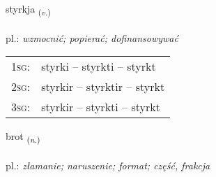 \documentclass[frontgrid, backgrid]{flacards}\usepackage[]{graphicx}\usepackage[]{xcolor}
\begin{document}
\renewcommand{\blhead}{\vskip5pt {\small\bfseries\footnotesize Sagnorð | czasownik }}
\renewcommand{\bcfoot}{\vskip5pt \hspace{2pt}{\small\bfseries\footnotesize 1K}}


{styrkja \small{\textsubscript{(\textit{v.})}} \\[1ex] %
\textphonetic{[stɪr̥ca]} \\
pl.: \emph{wzmocnić; popierać; dofinansowywać} \\  [2ex]
\renewcommand*{\arraystretch}{0.8}
\begin{tabular}{p{1cm}l}
\textsc{1sg}: & styrki -- styrkti -- styrkt \\ 
\textsc{2sg}: & styrkir -- styrktir -- styrkt \\ 
\textsc{3sg}: & styrkir -- styrkti -- styrkt \\ 
\end{tabular}
}

\renewcommand{\flhead}{\vskip5pt \fboxsep=0pt {\small\bfseries\footnotesize Nafnorð | rzeczownik}}
\renewcommand{\fcfoot}{\vskip5pt \fboxsep=0pt \hspace{2pt}{\small\bfseries\footnotesize 1K}}

\renewcommand{\blhead}{\vskip5pt {\small\bfseries\footnotesize Nafnorð | rzeczownik }}
\renewcommand{\bcfoot}{\vskip5pt \hspace{2pt}{\small\bfseries\footnotesize 1K}}


{brot \small{\textsubscript{(\textit{n.})}} \\[1ex] %
\textphonetic{[prɔːt]} \\
pl.: \emph{złamanie; naruszenie; format; część, frakcja} \\  [2ex]
\renewcommand*{\arraystretch}{0.8}
}
\end{document}
